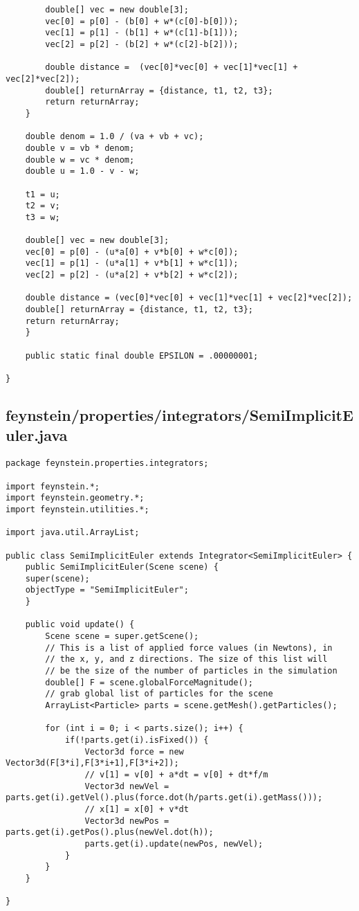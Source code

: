 \begin{lstlisting}
	    double[] vec = new double[3];
	    vec[0] = p[0] - (b[0] + w*(c[0]-b[0]));
	    vec[1] = p[1] - (b[1] + w*(c[1]-b[1]));
	    vec[2] = p[2] - (b[2] + w*(c[2]-b[2]));
	    
	    double distance =  (vec[0]*vec[0] + vec[1]*vec[1] + vec[2]*vec[2]);
	    double[] returnArray = {distance, t1, t2, t3};
	    return returnArray;
	}
	
	double denom = 1.0 / (va + vb + vc);
	double v = vb * denom;
	double w = vc * denom;
	double u = 1.0 - v - w;

	t1 = u;
	t2 = v;
	t3 = w;

	double[] vec = new double[3];
	vec[0] = p[0] - (u*a[0] + v*b[0] + w*c[0]);
	vec[1] = p[1] - (u*a[1] + v*b[1] + w*c[1]);
	vec[2] = p[2] - (u*a[2] + v*b[2] + w*c[2]);

	double distance = (vec[0]*vec[0] + vec[1]*vec[1] + vec[2]*vec[2]);
	double[] returnArray = {distance, t1, t2, t3};
	return returnArray;
    }
    
    public static final double EPSILON = .00000001;

}\end{lstlisting}

\subsection*{feynstein/properties/integrators/SemiImplicitEuler.java}
\begin{lstlisting}
package feynstein.properties.integrators;

import feynstein.*;
import feynstein.geometry.*;
import feynstein.utilities.*;

import java.util.ArrayList;

public class SemiImplicitEuler extends Integrator<SemiImplicitEuler> {
    public SemiImplicitEuler(Scene scene) {
	super(scene);
	objectType = "SemiImplicitEuler";
    }
	
    public void update() {
		Scene scene = super.getScene();
		// This is a list of applied force values (in Newtons), in 
		// the x, y, and z directions. The size of this list will
		// be the size of the number of particles in the simulation
		double[] F = scene.globalForceMagnitude();
		// grab global list of particles for the scene
		ArrayList<Particle> parts = scene.getMesh().getParticles();
	
		for (int i = 0; i < parts.size(); i++) {
			if(!parts.get(i).isFixed()) {
				Vector3d force = new Vector3d(F[3*i],F[3*i+1],F[3*i+2]);
				// v[1] = v[0] + a*dt = v[0] + dt*f/m
				Vector3d newVel = parts.get(i).getVel().plus(force.dot(h/parts.get(i).getMass()));
				// x[1] = x[0] + v*dt
				Vector3d newPos = parts.get(i).getPos().plus(newVel.dot(h));
				parts.get(i).update(newPos, newVel);
			}
		}
    }

}\end{lstlisting}

